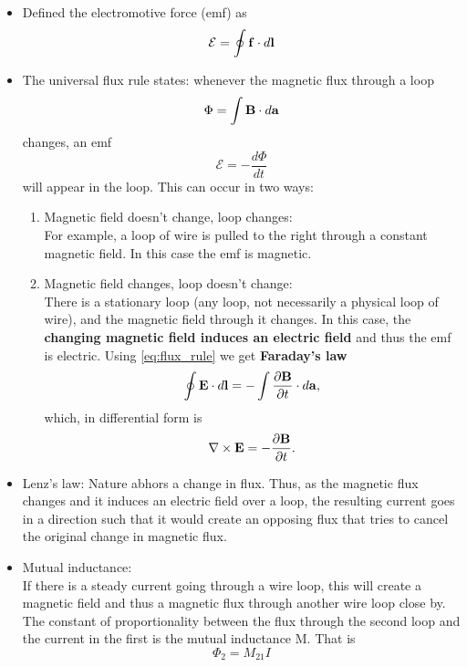 \documentclass[a4paper,11pt]{report}
\begin{document}
\begin{itemize} 
\item Defined the electromotive force (emf) as
\begin{equation}
\mathcal{E} = \oint \mathbf{f} \cdot d \mathbf{l}
\end{equation}

\item The universal flux rule states: whenever the magnetic flux through a loop
\begin{equation}
\Phi = \int \mathbf{B} \cdot d\mathbf{a}
\end{equation}
changes, an emf
\begin{equation}
\label{eq:flux_rule}
\mathcal{E} = -\frac{d \Phi}{dt}
\end{equation}
will appear in the loop. This can occur in two ways:
\begin{enumerate}
\item Magnetic field doesn't change, loop changes:\\
For example, a loop of wire is pulled to the right through a constant magnetic field. In this case the emf is magnetic.
\item Magnetic field changes, loop doesn't change:\\
There is a stationary loop (any loop, not necessarily a physical loop of wire), and the magnetic field through it changes. In this case, the \textbf{changing magnetic field induces an electric field} and thus the emf is electric. Using \cref{eq:flux_rule} we get \textbf{Faraday's law}
\begin{equation}
\oint \mathbf{E} \cdot d\mathbf{l} = - \int \frac{ \partial \mathbf{B} }{\partial t} \cdot d\mathbf{a},
\end{equation}
which, in differential form is
\begin{equation}
\nabla \times \mathbf{E} = -\frac{ \partial \mathbf{B}}{\partial t}.
\end{equation}
\end{enumerate}

\item Lenz's law:
Nature abhors a change in flux. Thus, as the magnetic flux changes and it induces an electric field over a loop, the resulting current goes in a direction such that it would create an opposing flux that tries to cancel the original change in magnetic flux.

\item Mutual inductance:\\
If there is a steady current going through a wire loop, this will create a magnetic field and thus a magnetic flux through another wire loop close by. The constant of proportionality between the flux through the second loop and the current in the first is the mutual inductance M. That is
\begin{equation}
\Phi_2 = M_{21} I
\end{equation}


\end{itemize}
\end{document}
